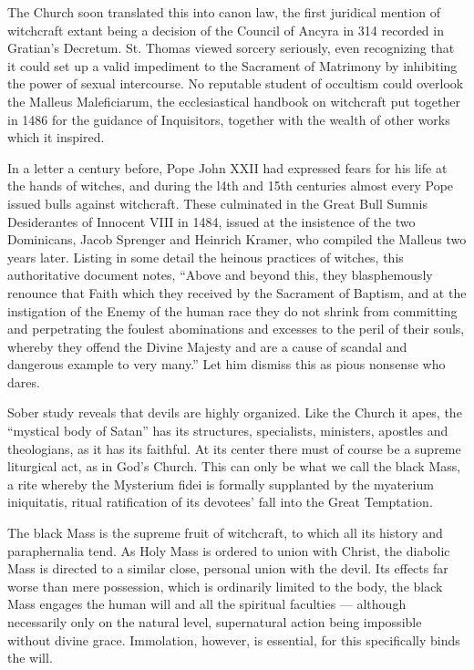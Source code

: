 The Church soon translated this into canon law, the first juridical mention of witchcraft extant being a decision of the Council of Ancyra in 314 recorded in Gratian's Decretum. St. Thomas viewed sorcery seriously, even recognizing that it could set up a valid impediment to the Sacrament of Matrimony by inhibiting the power of sexual intercourse. No reputable student of occultism could overlook the Malleus Maleficiarum, the ecclesiastical handbook on witchcraft put together in 1486 for the guidance of Inquisitors, together with the wealth of other works which it inspired.

In a letter a century before, Pope John XXII had expressed fears for his life at the hands of witches, and during the l4th and 15th centuries almost every Pope issued bulls against witchcraft. These culminated in the Great Bull Sumnis Desiderantes of Innocent VIII in 1484, issued at the insistence of the two Dominicans, Jacob Sprenger and Heinrich Kramer, who compiled the Malleus two years later. Listing in some detail the heinous practices of witches, this authoritative document notes, ``Above and beyond this, they blasphemously renounce that Faith which they received by the Sacrament of Baptism, and at the instigation of the Enemy of the human race they do not shrink from committing and perpetrating the foulest abominations and excesses to the peril of their souls, whereby they offend the Divine Majesty and are a cause of scandal and dangerous example to very many.'' Let him dismiss this as pious nonsense who dares.

Sober study reveals that devils are highly organized. Like the Church it apes, the ``mystical body of Satan'' has its structures, specialists, ministers, apostles and theologians, as it has its faithful. At its center there must of course be a supreme liturgical act, as in God's Church. This can only be what we call the black Mass, a rite whereby the Mysterium fidei is formally supplanted by the myaterium iniquitatis, ritual ratification of its devotees' fall into the Great Temptation.

The black Mass is the supreme fruit of witchcraft, to which all its history and paraphernalia tend. As Holy Mass is ordered to union with Christ, the diabolic Mass is directed to a similar close, personal union with the devil. Its effects far worse than mere possession, which is ordinarily limited to the body, the black Mass engages the human will and all the spiritual faculties --- although necessarily only on the natural level, supernatural action being impossible without divine grace. Immolation, however, is essential, for this specifically binds the will.

